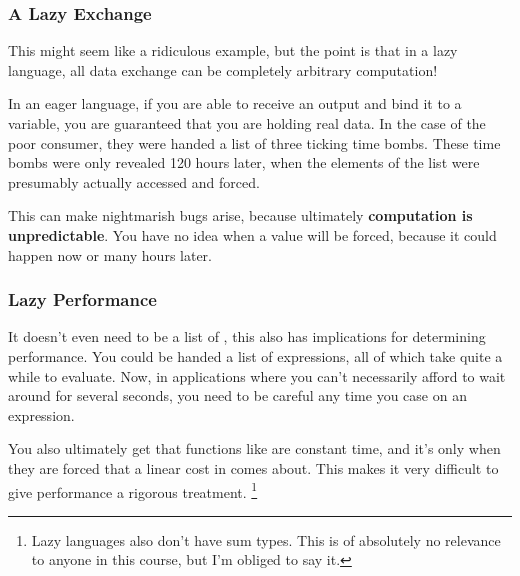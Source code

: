\documentclass[aspectratio=169]{beamer}
\begin{document}
\begin{frame}[fragile]
  \frametitle{A Lazy Exchange}

  This might seem like a ridiculous example, but the point is that in a
  lazy language, all data exchange can be completely arbitrary computation!

  \pause
  \vspace{\fill}

  In an eager language, if you are able to receive an output and bind it
  to a variable, you are guaranteed that you are holding real data. In the
  case of the poor consumer, they were handed a list of three ticking time
  bombs. These time bombs were only revealed 120 hours later, when the elements
  of the list were presumably actually accessed and forced.

  \pause
  \vspace{\fill}

  This can make nightmarish bugs arise, because ultimately
  \textbf{computation is unpredictable}. You have no idea when a value will be
  forced, because it could happen now or many hours later.
\end{frame}

\begin{frame}[fragile]
  \frametitle{Lazy Performance}

  It doesn't even need to be a list of , this also has
  implications for determining performance. You could be handed a list
  of expressions, all of which take quite a while to evaluate. Now, in
  applications where you can't necessarily afford to wait around for
  several seconds, you need to be careful any time you case on an expression.

  \pause
  \vspace{\fill}

  You also ultimately get that functions like  are constant time,
  and it's only when they are forced that a linear cost in  comes
  about. This makes it very difficult to give performance a rigorous treatment.
  \footnote{Lazy languages also don't have sum types. This is of absolutely no
  relevance to anyone in this course, but I'm obliged to say it.}
\end{frame}
\end{document}
